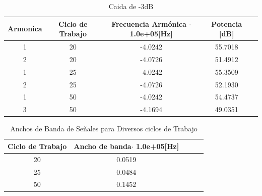 \documentclass[letterpaper, titlepage]{article}
\begin{document}
\begin{enumerate}[a)]
					\begin{table}[ht]
						\centering
						\begin{tabular}{c c c c c}
							Armonica & Ciclo de Trabajo & Frecuencia Armónica $\cdot$ 1.0e+05[Hz] & Potencia [dB]\\
							\hline
							1 & 20 & -4.0242 & 55.7018  \\
							2 & 20 & -4.0726 & 51.4912	\\
							1 & 25 & -4.0242 & 55.3509   \\
							2 & 25 & -4.0726 & 52.1930   \\
							1 & 50 & -4.0242 & 54.4737  \\
							3 & 50 & -4.1694 & 49.0351   \\
						\end{tabular}
						\caption{Caida de -3dB}
						\label{tab:tabla1}
					\end{table}				

					\begin{table}[ht]
						\centering
						\begin{tabular}{c c c c c}
							Ciclo de Trabajo & Ancho de banda$\cdot$ 1.0e+05[Hz] \\
							\hline
							20 & 0.0519  \\
							25 & 0.0484	  \\
							50 & 0.1452   \\
						\end{tabular}
						\caption{Anchos de Banda de Señales para Diversos ciclos de Trabajo}
						\label{tab:tabla1}
					\end{table}			
					\newpage
			\end{enumerate}
	
\end{document}
